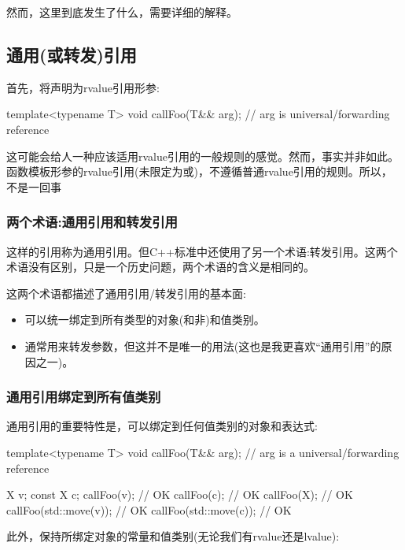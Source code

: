 然而，这里到底发生了什么，需要详细的解释。

\subsection{通用(或转发)引用}

首先，将声明为rvalue引用形参:

\begin{cppcode}
template<typename T>
void callFoo(T&& arg); // arg is universal/forwarding reference
\end{cppcode}

这可能会给人一种应该适用rvalue引用的一般规则的感觉。然而，事实并非如此。函数模板形参的rvalue引用(未限定为或)，不遵循普通rvalue引用的规则。所以，不是一回事

\subsubsection{两个术语:通用引用和转发引用}

这样的引用称为通用引用。但C++标准中还使用了另一个术语:转发引用。这两个术语没有区别，只是一个历史问题，两个术语的含义是相同的。

这两个术语都描述了通用引用/转发引用的基本面:

\begin{itemize}
	\item 可以统一绑定到所有类型的对象(和非)和值类别。
	\item 通常用来转发参数，但这并不是唯一的用法(这也是我更喜欢“通用引用”的原因之一)。
\end{itemize}

\subsubsection{通用引用绑定到所有值类别}

通用引用的重要特性是，可以绑定到任何值类别的对象和表达式:

\begin{cppcode}
template<typename T>
void callFoo(T&& arg); // arg is a universal/forwarding reference

X v;
const X c;
callFoo(v); // OK
callFoo(c); // OK
callFoo(X{}); // OK
callFoo(std::move(v)); // OK
callFoo(std::move(c)); // OK
\end{cppcode}

此外，保持所绑定对象的常量和值类别(无论我们有rvalue还是lvalue):

